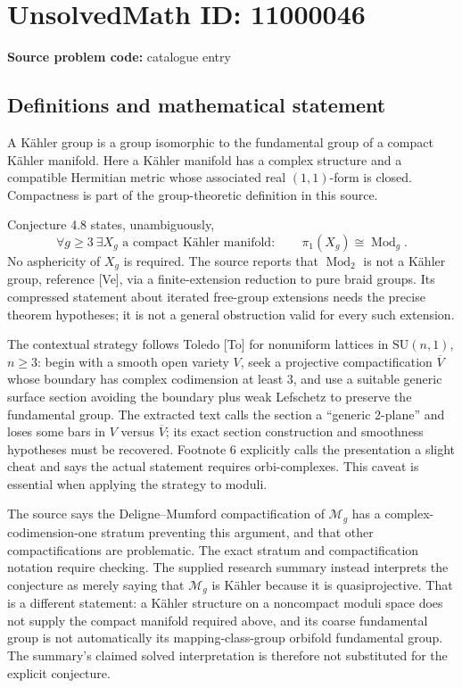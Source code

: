 \documentclass[11pt]{article}
\begin{document}
\section*{UnsolvedMath ID: 11000046}
\textbf{Source problem code:} catalogue entry
\subsection{Definitions and mathematical statement}
A Kähler group is a group isomorphic to the fundamental group of a compact Kähler manifold. Here a Kähler manifold has a complex structure and a compatible Hermitian metric whose associated real \((1,1)\)-form is closed. Compactness is part of the group-theoretic definition in this source.

Conjecture 4.8 states, unambiguously,
\[
 \forall g\ge3\ \exists X_g\text{ a compact Kähler manifold}:\qquad
 \pi_1(X_g)\cong\operatorname{Mod}_g.
\]
No asphericity of \(X_g\) is required. The source reports that \(\operatorname{Mod}_2\) is not a Kähler group, reference [Ve], via a finite-extension reduction to pure braid groups. Its compressed statement about iterated free-group extensions needs the precise theorem hypotheses; it is not a general obstruction valid for every such extension.

The contextual strategy follows Toledo [To] for nonuniform lattices in \(\mathrm{SU}(n,1)\), \(n\ge3\): begin with a smooth open variety \(V\), seek a projective compactification \(\overline V\) whose boundary has complex codimension at least \(3\), and use a suitable generic surface section avoiding the boundary plus weak Lefschetz to preserve the fundamental group. The extracted text calls the section a ``generic 2-plane'' and loses some bars in \(V\) versus \(\overline V\); its exact section construction and smoothness hypotheses must be recovered. Footnote 6 explicitly calls the presentation a slight cheat and says the actual statement requires orbi-complexes. This caveat is essential when applying the strategy to moduli.

The source says the Deligne--Mumford compactification of \(\mathcal M_g\) has a complex-codimension-one stratum preventing this argument, and that other compactifications are problematic. The exact stratum and compactification notation require checking. The supplied research summary instead interprets the conjecture as merely saying that \(\mathcal M_g\) is Kähler because it is quasiprojective. That is a different statement: a Kähler structure on a noncompact moduli space does not supply the compact manifold required above, and its coarse fundamental group is not automatically its mapping-class-group orbifold fundamental group. The summary's claimed solved interpretation is therefore not substituted for the explicit conjecture.
\end{document}
